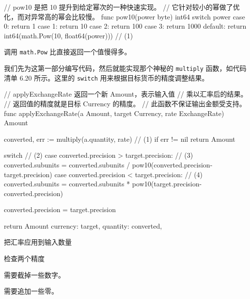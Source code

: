 \begin{gocode}[title={代码清单 6.19 \texttt{decimal.go}：\texttt{pow10()}}]
// pow10 是把 10 提升到给定幂次的一种快速实现。
// 它针对较小的幂做了优化，而对异常高的幂会比较慢。
func pow10(power byte) int64 {
    switch power {
    case 0:
        return 1
    case 1:
        return 10
    case 2:
        return 100
    case 3:
        return 1000
    default:
        return int64(math.Pow(10, float64(power))) // (1)
    }
}
\end{gocode}

\begin{codeannotations}
\item 调用 \texttt{math.Pow} 比直接返回一个值慢得多。
\end{codeannotations}

我们先为这第一部分编写代码，然后就能实现那个神秘的 \texttt{multiply} 函数，如代码清单 6.20 所示。这里的 \texttt{switch} 用来根据目标货币的精度调整结果。

\begin{gocode}[title={代码清单 6.20 \texttt{convert.go}：\texttt{applyExchangeRate}}]
// applyExchangeRate 返回一个新 Amount，表示输入值
// 乘以汇率后的结果。
// 返回值的精度就是目标 Currency 的精度。
// 此函数不保证输出金额受支持。
func applyExchangeRate(a Amount, target Currency, rate ExchangeRate) Amount {
    converted, err := multiply(a.quantity, rate) // (1)
    if err != nil {
        return Amount{}
    }

    switch { // (2)
    case converted.precision > target.precision: // (3)
        converted.subunits =
            converted.subunits / pow10(converted.precision-target.precision)
    case converted.precision < target.precision: // (4)
        converted.subunits =
            converted.subunits * pow10(target.precision-converted.precision)
    }

    converted.precision = target.precision

    return Amount{
        currency: target,
        quantity: converted,
    }
}
\end{gocode}

\begin{codeannotations}
\item 把汇率应用到输入数量
\item 检查两个精度
\item 需要截掉一些数字。
\item 需要追加一些零。
\end{codeannotations}

